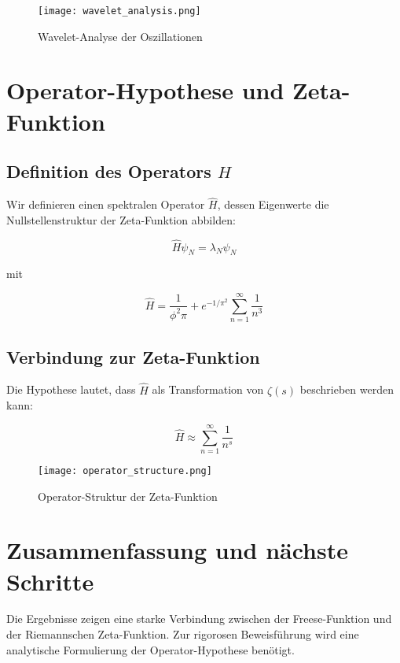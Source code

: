 \documentclass[a4paper,12pt]{article}
\begin{document}
\begin{figure}[h]
    \centering
    \texttt{[image: wavelet\_analysis.png]}
    \caption{Wavelet-Analyse der Oszillationen}
\end{figure}

\section{Operator-Hypothese und Zeta-Funktion}

\subsection{Definition des Operators \( H \)}
Wir definieren einen spektralen Operator \( \hat{H} \), dessen Eigenwerte die Nullstellenstruktur der Zeta-Funktion abbilden:

\begin{equation}
    \hat{H} \psi_N = \lambda_N \psi_N
\end{equation}

mit

\begin{equation}
    \hat{H} = \frac{1}{\phi^2 \pi} + e^{-1/\pi^2} \sum_{n=1}^{\infty} \frac{1}{n^3}
\end{equation}

\subsection{Verbindung zur Zeta-Funktion}
Die Hypothese lautet, dass \( \hat{H} \) als Transformation von \( \zeta(s) \) beschrieben werden kann:

\begin{equation}
    \hat{H} \approx \sum_{n=1}^{\infty} \frac{1}{n^s}
\end{equation}

\begin{figure}[h]
    \centering
    \texttt{[image: operator\_structure.png]}
    \caption{Operator-Struktur der Zeta-Funktion}
\end{figure}

\section{Zusammenfassung und nächste Schritte}
Die Ergebnisse zeigen eine starke Verbindung zwischen der Freese-Funktion und der Riemannschen Zeta-Funktion. Zur rigorosen Beweisführung wird eine analytische Formulierung der Operator-Hypothese benötigt.
\end{document}
